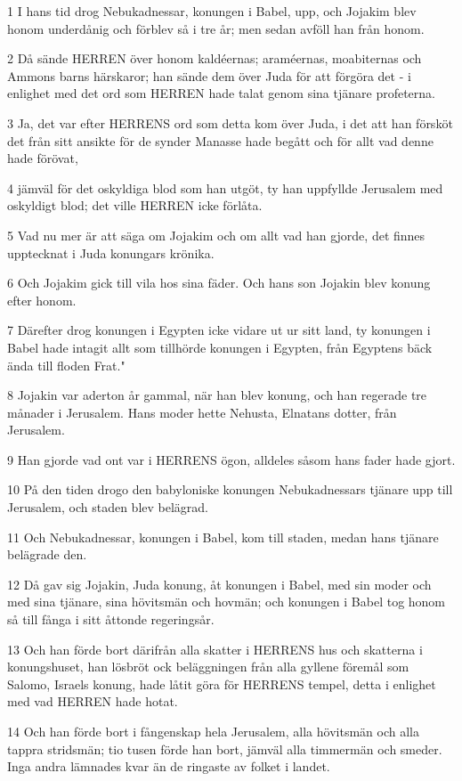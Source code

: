 \par 1 I hans tid drog Nebukadnessar, konungen i Babel, upp, och Jojakim blev honom underdånig och förblev så i tre år; men sedan avföll han från honom.
\par 2 Då sände HERREN över honom kaldéernas; araméernas, moabiternas och Ammons barns härskaror; han sände dem över Juda för att förgöra det - i enlighet med det ord som HERREN hade talat genom sina tjänare profeterna.
\par 3 Ja, det var efter HERRENS ord som detta kom över Juda, i det att han försköt det från sitt ansikte för de synder Manasse hade begått och för allt vad denne hade förövat,
\par 4 jämväl för det oskyldiga blod som han utgöt, ty han uppfyllde Jerusalem med oskyldigt blod; det ville HERREN icke förlåta.
\par 5 Vad nu mer är att säga om Jojakim och om allt vad han gjorde, det finnes upptecknat i Juda konungars krönika.
\par 6 Och Jojakim gick till vila hos sina fäder. Och hans son Jojakin blev konung efter honom.
\par 7 Därefter drog konungen i Egypten icke vidare ut ur sitt land, ty konungen i Babel hade intagit allt som tillhörde konungen i Egypten, från Egyptens bäck ända till floden Frat."
\par 8 Jojakin var aderton år gammal, när han blev konung, och han regerade tre månader i Jerusalem. Hans moder hette Nehusta, Elnatans dotter, från Jerusalem.
\par 9 Han gjorde vad ont var i HERRENS ögon, alldeles såsom hans fader hade gjort.
\par 10 På den tiden drogo den babyloniske konungen Nebukadnessars tjänare upp till Jerusalem, och staden blev belägrad.
\par 11 Och Nebukadnessar, konungen i Babel, kom till staden, medan hans tjänare belägrade den.
\par 12 Då gav sig Jojakin, Juda konung, åt konungen i Babel, med sin moder och med sina tjänare, sina hövitsmän och hovmän; och konungen i Babel tog honom så till fånga i sitt åttonde regeringsår.
\par 13 Och han förde bort därifrån alla skatter i HERRENS hus och skatterna i konungshuset, han lösbröt ock beläggningen från alla gyllene föremål som Salomo, Israels konung, hade låtit göra för HERRENS tempel, detta i enlighet med vad HERREN hade hotat.
\par 14 Och han förde bort i fångenskap hela Jerusalem, alla hövitsmän och alla tappra stridsmän; tio tusen förde han bort, jämväl alla timmermän och smeder. Inga andra lämnades kvar än de ringaste av folket i landet.
